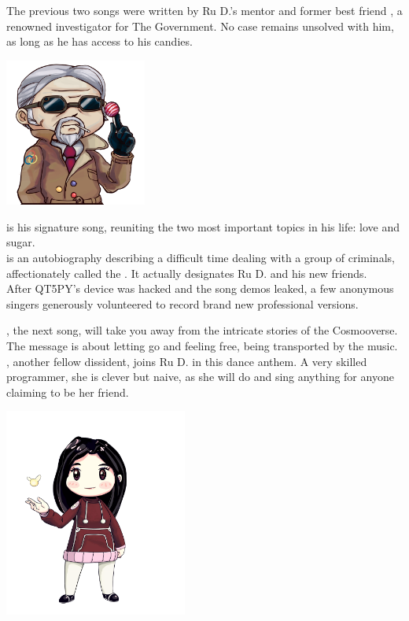 
The previous two songs were written by Ru D.'s mentor and former best friend , a renowned investigator for The Government. No case remains unsolved with him, as long as he has access to his candies. 

\begin{center}
\includegraphics[width=0.35\textwidth]{Assets/qt5c_small}
\end{center}

 is his signature song, reuniting the two most important topics in his life: love and sugar.\\

 is an autobiography describing a difficult time dealing with a group of criminals, affectionately called the . It actually designates Ru D. and his new friends. \\

After QT5PY's device was hacked and the song demos leaked, a few anonymous singers generously volunteered to record brand new professional versions.

\clearpage
{}

, the next song, will take you away from the intricate stories of the Cosmooverse. The message is about letting go and feeling free, being transported by the music.\\

, another fellow dissident, joins Ru D. in this dance anthem. A very skilled programmer, she is clever but naive, as she will do and sing anything for anyone claiming to be her friend. 

\begin{center}
\includegraphics[width=0.45\textwidth]{Assets/florrie}
\end{center}

\clearpage